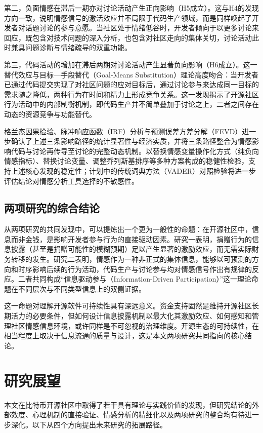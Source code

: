 \documentclass[
    type = master, %
    degree = professional,        %
    decl-page,  %
    twoside,                %
    fontset = fandol %
  ]{njuthesis}
\begin{document}
第二，负面情感在滞后一期亦对讨论活动产生正向影响（H5成立）。这与H4的发现方向一致，说明情感信号的激活效应并不局限于代码生产领域，而是同样唤起了开发者对话题讨论的参与意愿。当社区处于情绪低谷时，开发者倾向于以更多讨论来回应，既包含对技术问题的深入分析，也包含对社区走向的集体关切，讨论活动此时兼具问题诊断与情绪疏导的双重功能。

第三，代码活动的增加在滞后两期对讨论活动产生显著负向影响（H6成立）。这一替代效应与目标—手段替代（Goal-Means Substitution）理论高度吻合\cite{kruglanski2002theory}：当开发者已通过代码提交实现了对社区问题的应对目标后，通过讨论参与来达成同一目标的需求随之降低，两种行为在时间和精力上形成竞争关系。这一发现揭示了开源社区行为活动中的内部制衡机制，即代码生产并不简单叠加于讨论之上，二者之间存在动态的资源竞争与功能替代。

格兰杰因果检验、脉冲响应函数（IRF）分析与预测误差方差分解（FEVD）进一步确认了上述三条影响路径的统计显著性与经济实质，并将三条路径整合为情感影响代码与讨论再传导至讨论的完整动态机制。以替换情感变量操作化方式（纯负向情感指标）、替换讨论变量、调整乔列斯基排序等多种方案构成的稳健性检验，支持上述核心发现的稳定性；计划中的传统词典方法（VADER）对照检验将进一步评估结论对情感分析工具选择的不敏感性。

\subsection{两项研究的综合结论}

从两项研究的共同发现中，可以提炼出一个更为一般性的命题：在开源社区中，信息而非金钱，是影响开发者参与行为的直接驱动因素。研究一表明，捐赠行为的信息披露（甚至是捐赠可能性的模糊预期）足以产生显著的激励效应，而无需实际财务转移的发生。研究二表明，情感作为一种非正式的集体信息，能够以可预测的方向和时序影响后续的行为活动，代码生产与讨论参与均对情感信号作出有规律的反应。二者共同构成“信息驱动参与（Information-Driven Participation）”这一理论命题在不同层次与不同类型信息上的双侧证据。

这一命题对理解开源软件可持续性具有深远意义。资金支持固然是维持开源社区长期活力的必要条件，但如何设计信息披露机制以最大化其激励效应、如何感知和管理社区情感信息环境，或许同样是不可忽视的治理维度。开源生态的可持续性，在相当程度上取决于信息流通的质量与设计，这是本文两项研究共同指向的核心结论。

\section{研究展望}

本文在比特币开源社区中取得了若干具有理论与实践价值的发现，但研究结论的外部效度、心理机制的直接验证、情感分析的精细化以及两项研究的整合均有待进一步深化。以下从四个方向提出未来研究的拓展路径。
\end{document}
